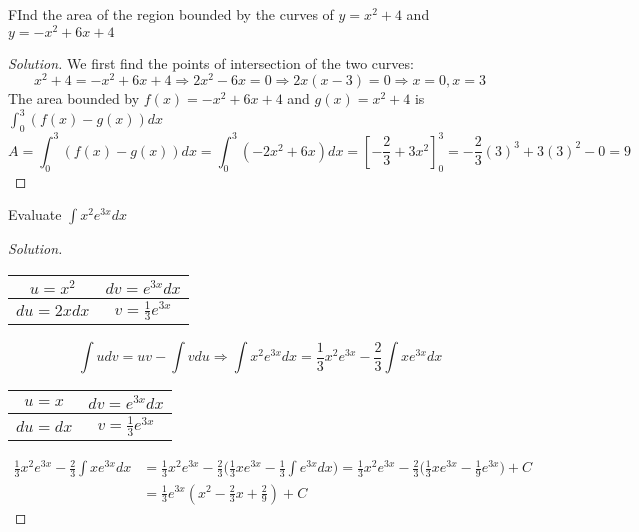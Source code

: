 \documentclass[crop=false,class=article,oneside]{standalone}
\begin{document}
        \begin{problem}
        FInd the area of the region bounded by the curves of $y=x^{2}+4$ and $y=-x^{2}+6x+4$
        \end{problem}
        \begin{proof}[Solution]
        We first find the points of intersection of the two curves:
        \begin{equation*}
            x^{2}+4=-x^{2}+6x+4\Rightarrow2x^{2}-6x=0\Rightarrow 2x(x-3)=0\Rightarrow x=0,x=3
        \end{equation*}
        The area bounded by $f(x)=-x^{2}+6x+4$ and $g(x)=x^{2}+4$ is $\int_{0}^{3}(f(x)-g(x))dx$
        \begin{equation*}
            A=\int_{0}^{3}(f(x)-g(x))dx=\int_{0}^{3}(-2x^{2}+6x)dx=[-\frac{2}{3}+3x^{2}]_{0}^{3}=-\frac{2}{3}(3)^{3}+3(3)^{2}-0=9
        \end{equation*}
        \end{proof}
        \begin{problem}
        Evaluate $\int x^{2}e^{3x}dx$
        \end{problem}
        \begin{proof}[Solution]
        \
        \begin{table}[H]
            \centering
            \begin{tabular}{|c|c|}
                \hline
                $u=x^{2}$&$dv=e^{3x}dx$\\
                \hline
                $du=2xdx$&$v=\frac{1}{3}e^{3x}$\\
                \hline
            \end{tabular}
        \end{table}
        \begin{equation*}
            \int udv=uv-\int vdu\Rightarrow \int x^{2}e^{3x}dx=\frac{1}{3}x^{2}e^{3x}-\frac{2}{3}\int xe^{3x}dx
        \end{equation*}
        \begin{table}[H]
            \centering
            \begin{tabular}{|c|c|}
                \hline
                $u=x$&$dv=e^{3x}dx$\\
                \hline
                $du=dx$&$v=\frac{1}{3}e^{3x}$\\
                \hline
            \end{tabular}
        \end{table}
        \begin{align*}
            \frac{1}{3}x^{2}e^{3x}-\frac{2}{3}\int xe^{3x}dx&=\frac{1}{3}x^{2}e^{3x}-\frac{2}{3}\big(\frac{1}{3}xe^{3x}-\frac{1}{3}\int e^{3x}dx\big)=\frac{1}{3}x^{2}e^{3x}-\frac{2}{3}\big(\frac{1}{3}xe^{3x}-\frac{1}{9}e^{3x}\big)+C\\
            &=\frac{1}{3}e^{3x}(x^{2}-\frac{2}{3}x+\frac{2}{9})+C
        \end{align*}
        \end{proof}
\end{document}
